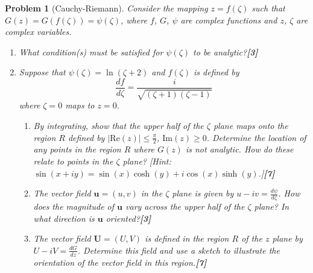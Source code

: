 \documentclass[a4paper]{article}
\theoremstyle{new}
\newtheorem{qns}{Problem}[section]
\begin{document}
\begin{qns}[Cauchy-Riemann]
Consider the mapping $z = f(\zeta)$ such that $G(z) = G(f(\zeta)) =\psi(\zeta)$, where $f$, $G$, $\psi$ are complex functions and $z$, $\zeta$ are complex variables.
\begin{enumerate}[label=(\alph*)]
\item What condition(s) must be satisfied for $\psi(\zeta)$ to be analytic?\hfill\textbf{[3]}
\item Suppose that $\psi(\zeta)=\ln(\zeta+2)$ and $f(\zeta)$ is defined by
\begin{equation}
\frac{df}{d\zeta}=\frac{i}{\sqrt{(\zeta+1)(\zeta-1)}}\tag{*}
\end{equation}
where $\zeta=0$ maps to $z = 0$.
\begin{enumerate}[label=(\roman*)]
\item By integrating, show that the upper half of the $\zeta$ plane maps onto the region $R$ defined by $|\text{Re}(z)|\leq\frac{\pi}{2}$, $\text{Im}(z)\geq 0$. Determine the location of any points in the region $R$ where $G(z)$ is not analytic. How do these relate to points in the $\zeta$ plane? [Hint: $\sin(x + iy) = \sin(x) \cosh(y) + i \cos(x) \sinh(y)$.]\hfill\textbf{[7]}
\item The vector field $\mathbf{u} = (u, v)$ in the $\zeta$ plane is given by $u − iv =\frac{d\psi}{d\zeta}$. How does the magnitude of $\mathbf{u}$ vary across the upper half of the $\zeta$ plane? In what direction is $\mathbf{u}$ oriented?\hfill\textbf{[3]}
\item The vector field $\mathbf{U} = (U, V )$ is defined in the region $R$ of the $z$ plane by $U − iV =\frac{dG}{dz}$. Determine this field and use a sketch to illustrate the orientation of the vector field in this region.\hfill\textbf{[7]}
\end{enumerate}
\end{enumerate}
\end{qns}
\end{document}
